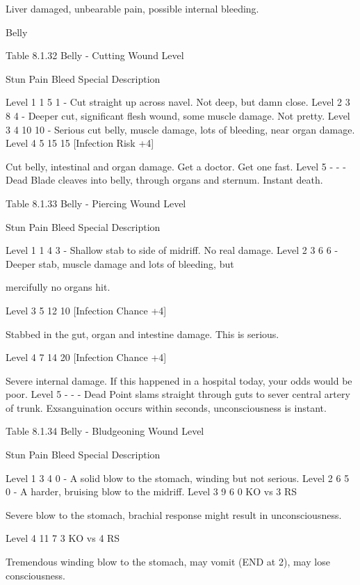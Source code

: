 \documentclass[oneside,11pt,english]{book}
\begin{document}
Liver damaged, unbearable pain, possible internal 
bleeding. 

 

 

Belly 

 

Table 8.1.32 Belly - Cutting 
Wound 
Level 

Stun Pain Bleed Special Description 

Level 1 1 5 1 - Cut straight up across navel. Not deep, but damn close. 
Level 2 3 8 4 - Deeper cut, significant flesh wound, some muscle 
damage. Not pretty. 
Level 3 4 10 10 - Serious cut belly, muscle damage, lots of bleeding, near 
organ damage. 
Level 4 5 15 15 [Infection Risk 
+4] 

Cut belly, intestinal and organ damage. Get a doctor. Get 
one fast. 
Level 5 - - - Dead Blade cleaves into belly, through organs and sternum. 
Instant death. 

 
Table 8.1.33 Belly - Piercing 
Wound 
Level 

Stun Pain Bleed Special Description 

Level 1 1 4 3 - Shallow stab to side of midriff. No real damage. 
Level 2 3 6 6 - Deeper stab, muscle damage and lots of bleeding, but 


mercifully no organs hit. 

Level 3 5 12 10 [Infection 
Chance +4] 

Stabbed in the gut, organ and intestine damage. This is serious. 

Level 4 7 14 20 [Infection 
Chance +4] 

Severe internal damage. If this happened in a hospital today, 
your odds would be poor. 
Level 5 - - - Dead Point slams straight through guts to sever central artery of 
trunk. Exsanguination occurs within seconds, unconsciousness 
is instant. 
 
Table 8.1.34 Belly - Bludgeoning 
Wound 
Level 

Stun Pain Bleed Special Description 

Level 1 3 4 0 - A solid blow to the stomach, winding but not serious. 
Level 2 6 5 0 - A harder, bruising blow to the midriff. 
Level 3 9 6 0 KO vs 3 
RS 

Severe blow to the stomach, brachial response might result in 
unconsciousness. 

Level 4 11 7 3 KO vs 4 
RS 

Tremendous winding blow to the stomach, may vomit (END at 
2), may lose consciousness. 
\end{document}
